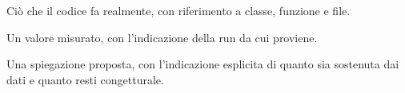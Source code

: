 \begin{implementazione}
Ciò che il codice fa realmente, con riferimento a classe, funzione e file.
\end{implementazione}

\begin{osservazione}
Un valore misurato, con l'indicazione della run da cui proviene.
\end{osservazione}

\begin{interpretazione}
Una spiegazione proposta, con l'indicazione esplicita di quanto sia sostenuta
dai dati e quanto resti congetturale.
\end{interpretazione}

\cleardoublepage
